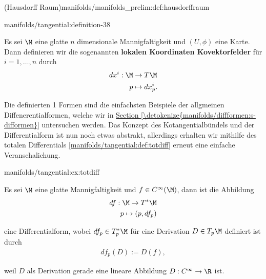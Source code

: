 \documentclass[letterpaper,10pt,english]{jupyterBook}
\begin{document}
\begin{definition}{(Hausdorff Raum)}{manifolds/manifolds_prelim:def:hausdorffraum}
\begin{definition}{}{manifolds/tangential:definition-38}
\par
Es sei \(\M\) eine glatte \(n\) dimensionale Mannigfaltigkeit und \((U,\phi)\) eine Karte.
Dann definieren wir die sogenannten \textbf{lokalen Koordinaten Kovektorfelder} für \(i=1,\ldots,n\) durch
\begin{align*}
dx^{i}:\M&\to T\M\\
p&\mapsto dx^{i}_p.\end{align*}\end{definition}

\par
Die definierten 1 Formen sind die einfachsten Beispiele der allgmeinen Diffenerentialformen, welche wir in \hyperref[\detokenize{manifolds/diffformen:s-difformen}]{Section \ref{\detokenize{manifolds/diffformen:s-difformen}}} untersuchen werden. Das Konzept des Kotangentialbündels und der Differentialform ist nun noch etwas abstrakt, allerdings erhalten wir mithilfe des totalen Differentials \cref{manifolds/tangential:def:totdiff} erneut eine einfache Veranschalichung.
\begin{example}{}{manifolds/tangential:ex:totdiff}



\par
Es sei \(\M\) eine glatte Mannigfaltigkeit und \(f\in C^\infty(\M)\), dann ist die Abbildung
\begin{align*}
df:\M\to T^\ast\M\\
p\mapsto (p, df_p)
\end{align*}
\par
eine Differentialform, wobei \(df_p\in T_p^\ast\M\) für eine Derivation \(D\in T_p\M\) definiert ist durch
\begin{align*}
df_p(D) := D(f),
\end{align*}
\par
weil \(D\) als Derivation gerade eine lineare Abbildung \(D:C^\infty\to\R\) ist.


\end{example}
\end{definition}
\end{document}
